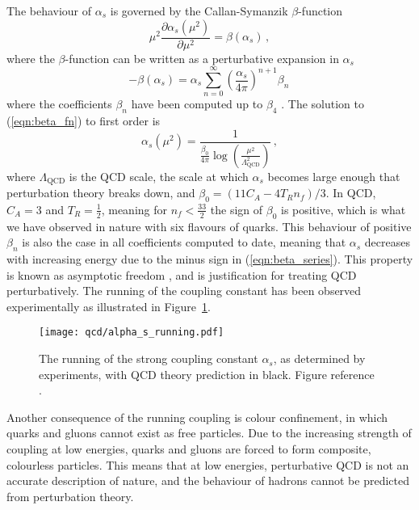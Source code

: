 \documentclass[main.tex]{subfiles}
\begin{document}
    The behaviour of $\alpha_{s}$
    is governed by the Callan-Symanzik \cite{Callan:1970yg,Symanzik:1970rt}
    $\beta$-function
    \begin{equation}\label{eqn:beta_fn}
        \mu^{2} \dfrac{\partial \alpha_{s}(\mu^{2})}{\partial \mu^{2}} = \beta(\alpha_{s}) \, ,
    \end{equation}
    where the $\beta$-function can be written as a perturbative
    expansion in $\alpha_{s}$
    \begin{equation}\label{eqn:beta_series}
        -\beta(\alpha_{s}) = \alpha_{s}\sum_{n=0}^{\infty}\left(\dfrac{\alpha_{s}}{4\pi}\right)^{n+1} \beta_{n}\, 
    \end{equation}
    where the coefficients $\beta_{n}$ have been computed
    up to $\beta_{4}$ \cite{Baikov:2016tgj,Luthe:2017ttg}.
    The solution to (\ref{eqn:beta_fn}) to first order
    is
    \begin{equation}\label{eqn:1l_alpha}
        \alpha_{s}(\mu^{2}) = \dfrac{1}{\frac{\beta_{0}}{4\pi}\log\left(\frac{\mu^{2}}{\Lambda_{\mathrm{QCD}}^{2}}\right)} \, ,
    \end{equation}
    where $\Lambda_{\mathrm{QCD}}$ is the QCD scale,
    the scale at which $\alpha_{s}$ becomes
    large enough that perturbation theory breaks down,
    and $\beta_{0} = (11C_{A} - 4T_{R}n_{f})/3$.
    In QCD, $C_{A}=3$ and $T_{R}=\frac{1}{2}$, meaning for
    $n_{f} < \frac{33}{2}$ the sign of $\beta_{0}$ is positive,
    which is what we have observed in nature with six
    flavours of quarks. This behaviour of positive
    $\beta_{n}$ is also the case in all coefficients
    computed to date, meaning that $\alpha_{s}$
    decreases with increasing energy due to the minus sign
    in (\ref{eqn:beta_series}). This property is known as
    asymptotic freedom \cite{Gross:1973id,Politzer:1973fx},
    and is justification for treating QCD perturbatively.
    The running of the coupling constant has been
    observed experimentally as illustrated in Figure~\ref{fig:alpha_s_running}.

    \begin{figure}
        \texttt{[image: qcd/alpha\_s\_running.pdf]}
        \caption{The running of the strong coupling constant $\alpha_{s}$,
        as determined by experiments, with QCD theory prediction in black.
        Figure reference \cite{Workman:2022ynf}.}
        \label{fig:alpha_s_running}
    \end{figure}

    Another consequence of the running coupling
    is colour confinement, in which quarks and
    gluons cannot exist as free particles. Due
    to the increasing strength of coupling at low
    energies, quarks and gluons are forced to
    form composite, colourless particles. This means
    that at low energies, perturbative QCD
    is not an accurate description of nature,
    and the behaviour of hadrons cannot be predicted
    from perturbation theory.
    
\end{document}
